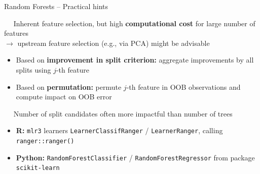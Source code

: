 \begin{frame}{Random Forests -- Practical hints}

 ~~ Inherent feature selection, but high 
\textbf{computational cost} for large number of features \\
$\rightarrow$ upstream feature selection (e.g., via PCA) might be advisable

\medskip


\begin{itemize}
  \item Based on \textbf{improvement in split criterion:} aggregate improvements 
  by all splits using $j$-th feature
  \item Based on \textbf{permutation:} permute $j$-th feature in 
  OOB observations and compute impact on OOB error
\end{itemize}

\medskip

 ~~ Number of split candidates often more impactful than 
number of trees

\medskip


\begin{itemize}
  \item \textbf{R:} \texttt{mlr3} learners \texttt{LearnerClassifRanger} / 
    \texttt{LearnerRanger}, calling \texttt{ranger::ranger()}
  \item \textbf{Python:} \texttt{RandomForestClassifier} / 
  \texttt{RandomForestRegressor} from package \texttt{scikit-learn}
\end{itemize}

\end{frame}